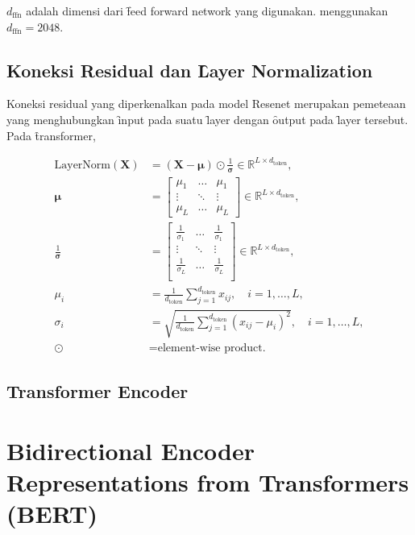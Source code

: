 	$d_{\text{ffn}}$ adalah dimensi dari \f{feed forward network} yang digunakan. \cite{transformerori} menggunakan $d_{\text{ffn}} = 2048$.

	\subsection{Koneksi Residual dan \f{Layer Normalization}}
	\label{sec:layer-normalization}


	Koneksi residual yang diperkenalkan pada model Resenet merupakan pemeteaan yang menghubungkan \f{input} pada suatu \f{layer} dengan \f{output} pada \f{layer} tersebut. Pada \f{transformer}, 

	\begin{align}
	\text{LayerNorm}(\mathbf{X}) &= (\mathbf{X}-\bm{\mu})\odot \frac{1}{\bm{\sigma}} \in \mathbb{R}^{ L\times d_{\text{token}}}, \\
	\bm{\mu} &= \begin{bmatrix}
	\mu_1 &\dots & \mu_1 \\
	\vdots & \ddots &\vdots \\
	\mu_L & \dots & \mu_L
	\end{bmatrix} \in \mathbb{R}^{L\times d_{\text{token}}}, \\
	\frac{1}{\bm{\sigma}} &= \begin{bmatrix}
	\frac{1}{\sigma_1} &\dots & \frac{1}{\sigma_1} \\
	\vdots & \ddots &\vdots \\
	\frac{1}{\sigma_L} &\dots & \frac{1}{\sigma_L} \\
	\end{bmatrix} \in \mathbb{R}^{L\times d_{\text{token}}}, \\
	\mu_i &= \frac{1}{d_\text{token}}\sum_{j=1}^{d_{\text{token}}} x_{ij},\quad i=1,\dots,L, \\
	\sigma_i &= \sqrt{\frac{1}{d_{\text{token}}} \sum_{j=1}^{d_{\text{token}}} (x_{ij}-\mu_i)^2}, \quad i = 1,\dots, L, \\
	\odot &= \text{element-wise product.} 
	\end{align}

	\subsection{Transformer Encoder}
	\label{sec:encoder}

\section{Bidirectional Encoder Representations from Transformers (BERT)}

